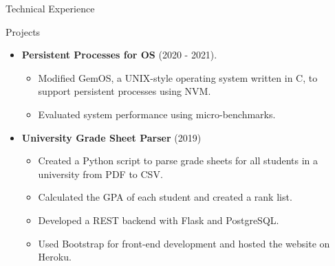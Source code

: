 \documentclass[]{mcdowellcv}
\begin{document}
	\begin{cvsection}{Technical Experience}
		\begin{cvsubsection}{Projects}{}{}
			\begin{itemize}

				\item \textbf{Persistent Processes for OS} (2020 - 2021).   \begin{itemize}
                    \item Modified GemOS, a UNIX-style operating system written in C, to support persistent processes using NVM.
				\item Evaluated system performance using micro-benchmarks.
			\end{itemize}

    		     \item \textbf{University Grade Sheet Parser} (2019)
           
           \begin{itemize}
				\item Created a Python script to parse grade sheets for all students in a university from PDF to CSV.
				\item Calculated the GPA of each student and created a rank list.
                    \item Developed a REST backend with Flask and PostgreSQL.
                    \item Used Bootstrap for front-end development and hosted the website on Heroku.
			\end{itemize}




   


    
        
			\end{itemize}
		\end{cvsubsection}
	\end{cvsection}
	
\end{document}
